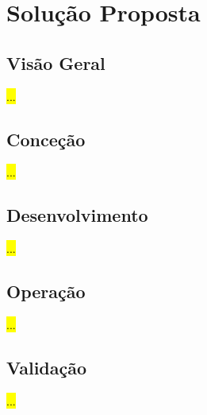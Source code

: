 
\chapter{Solução Proposta}
\label{chap:Chapter4}


\section{Visão Geral} 
\label{sec:chap4_general_vision}
\hl{...}


\section{Conceção} 
\label{sec:chap4_conception}
\hl{...}


\section{Desenvolvimento} 
\label{sec:chap4_development}
\hl{...}


\section{Operação} 
\label{sec:chap4_operation}
\hl{...}


\section{Validação} 
\label{sec:chap4_validation}
\hl{...}